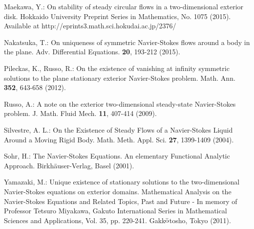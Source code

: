 \documentclass[11pt,a4paper]{article}
\begin{document}
\begin{thebibliography}{}
 Maekawa, Y.:
\newblock On stability of steady circular flows in a two-dimensional exterior disk. 
Hokkaido University Preprint Series in Mathematics, No. 1075 (2015).
Available at http://eprints3.math.sci.hokudai.ac.jp/2376/


 Nakatsuka, T.:
\newblock  On uniqueness of symmetric Navier-Stokes flows around a body in the plane. 
Adv. Differential Equations.  {\bf 20}, 193-212 (2015).


 Pileckas, K., Russo, R.:
\newblock On the existence of vanishing at infinity symmetric solutions to the plane stationary exterior Navier-Stokes problem. Math. Ann. {\bf 352}, 643-658 (2012).


 Russo, A.:
\newblock A note on the exterior two-dimensional steady-state Navier-Stokes problem.
J. Math. Fluid Mech. {\bf 11}, 407-414 (2009).


 Silvestre, A. L.:
\newblock On the Existence of Steady Flows of a Navier-Stokes Liquid Around a Moving Rigid Body. 
Math. Meth. Appl. Sci. {\bf 27}, 1399-1409 (2004).


 Sohr, H.:
\newblock The Navier-Stokes Equations. An elementary Functional Analytic Approach. 
Birkh\"{a}user-Verlag, Basel (2001). 


 Yamazaki, M.:
\newblock  Unique existence of stationary solutions to the two-dimensional Navier-Stokes equations on exterior domains.
Mathematical Analysis on the Navier-Stokes Equations and Related Topics, Past and Future - In memory of Professor Tetsuro Miyakawa,
Gakuto International Series in Mathematical Sciences and Applications, Vol. 35, pp. 220-241. Gakk${\rm \bar{o}}$tosho, Tokyo (2011).


\end{thebibliography}
\end{document}
